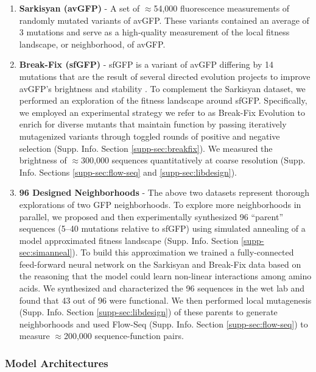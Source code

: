 \begin{enumerate}
  \item \textbf{Sarkisyan (avGFP)} - A set of $\approx$54,000 fluorescence measurements of randomly mutated variants of avGFP. These variants contained an average of 3 mutations and serve as a high-quality measurement of the local fitness landscape, or neighborhood, of avGFP. 

  \item \textbf{Break-Fix (sfGFP)} -  sfGFP is a variant of avGFP differing by 14 mutations that are the result of several directed evolution projects to improve avGFP's brightness and stability \cite{Pedelacq2006-nb}. To complement the Sarkisyan dataset, we performed an exploration of the fitness landscape around sfGFP. Specifically, we employed an experimental strategy we refer to as Break-Fix Evolution to enrich for diverse mutants that maintain function by passing iteratively mutagenized variants through toggled rounds of positive and negative selection (Supp. Info. Section \ref{supp-sec:breakfix}). We measured the brightness of $\approx$300,000 sequences quantitatively at coarse resolution (Supp. Info. Sections \ref{supp-sec:flow-seq} and \ref{supp-sec:libdesign}). 

  \item \textbf{96 Designed Neighborhoods} - The above two datasets represent thorough explorations of two GFP neighborhoods. To explore more neighborhoods in parallel, we proposed and then experimentally synthesized 96 ``parent'' sequences (5--40 mutations relative to sfGFP) using simulated annealing of a model approximated fitness landscape (Supp. Info. Section \ref{supp-sec:simanneal}).  To build this approximation we trained a fully-connected feed-forward neural network on the Sarkisyan and Break-Fix data based on the reasoning that the model could learn non-linear interactions among amino acids. We synthesized and characterized the 96 sequences in the wet lab and found that 43 out of 96 were functional. We then performed local mutagenesis (Supp. Info. Section \ref{supp-sec:libdesign}) of these parents to generate neighborhoods and used Flow-Seq (Supp. Info. Section \ref{supp-sec:flow-seq}) to measure $\approx$200,000 sequence-function pairs.
\end{enumerate}

\subsubsection{Model Architectures}

